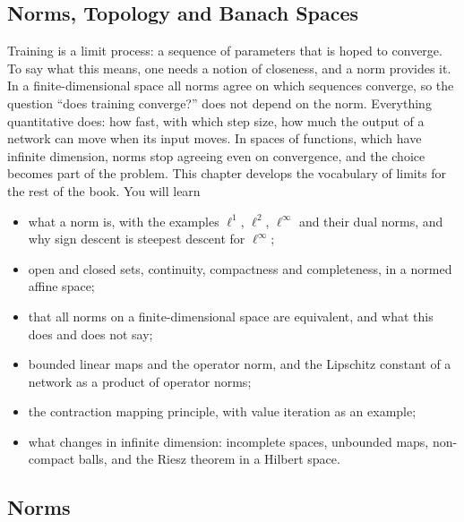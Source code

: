 \begin{notechapter}
\chapter{Norms, Topology and Banach Spaces}
\label{ch:norms-banach}

\begin{chapterintro}
Training is a limit process: a sequence of parameters that is hoped to
converge. To say what this means, one needs a notion of closeness, and a
norm provides it. In a finite-dimensional space all norms agree on which
sequences converge, so the question ``does training converge?'' does not
depend on the norm. Everything quantitative does: how fast, with which
step size, how much the output of a network can move when its input moves.
In spaces of functions, which have infinite dimension, norms stop agreeing
even on convergence, and the choice becomes part of the problem. This
chapter develops the vocabulary of limits for the rest of the book. You
will learn
\begin{itemize}[nosep]
  \item what a norm is, with the examples $\ell^1$, $\ell^2$, $\ell^\infty$
        and their dual norms, and why sign descent is steepest descent for
        $\ell^\infty$;
  \item open and closed sets, continuity, compactness and completeness, in
        a normed affine space;
  \item that all norms on a finite-dimensional space are equivalent, and
        what this does and does not say;
  \item bounded linear maps and the operator norm, and the Lipschitz
        constant of a network as a product of operator norms;
  \item the contraction mapping principle, with value iteration as an
        example;
  \item what changes in infinite dimension: incomplete spaces, unbounded
        maps, non-compact balls, and the Riesz theorem in a Hilbert space.
\end{itemize}
\end{chapterintro}

\section{Norms}\label{norms-banach:sec:norms}


\end{notechapter}
